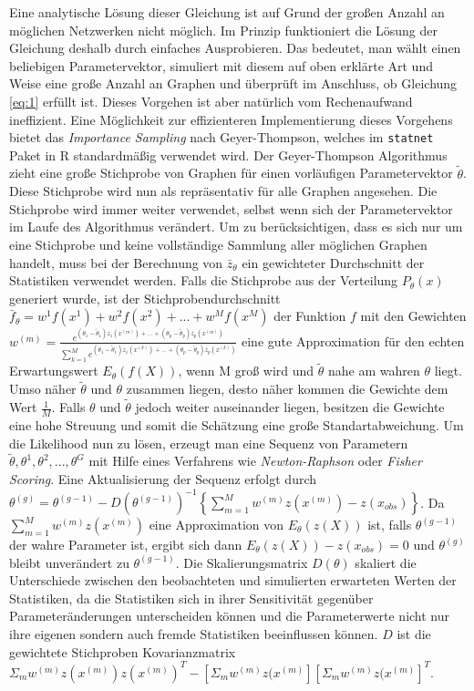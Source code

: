 \documentclass[a4paper,ngerman,oneside,titlepage,bibliography=totoc,11pt]{scrreprt}
\begin{document}
Eine analytische Lösung dieser Gleichung ist auf Grund der großen Anzahl an möglichen Netzwerken nicht möglich. Im Prinzip funktioniert die Lösung der Gleichung deshalb durch einfaches Ausprobieren. Das bedeutet, man wählt einen beliebigen Parametervektor, simuliert mit diesem auf oben erklärte Art und Weise eine große Anzahl an Graphen und überprüft im Anschluss, ob Gleichung \ref{eq:1} erfüllt ist. Dieses Vorgehen ist aber natürlich vom Rechenaufwand ineffizient. Eine Möglichkeit zur effizienteren Implementierung dieses Vorgehens bietet das \emph{Importance Sampling} nach Geyer-Thompson, welches im \texttt{statnet} Paket \citep{pack:statnet} in R  \citep{R} standardmäßig verwendet wird. Der Geyer-Thompson Algorithmus zieht eine große Stichprobe von Graphen für einen vorläufigen Parametervektor $\widetilde{\theta}$. Diese Stichprobe wird nun als repräsentativ für alle Graphen angesehen. Die Stichprobe wird immer weiter verwendet, selbst wenn sich der Parametervektor im Laufe des Algorithmus verändert. Um zu berücksichtigen, dass es sich nur um eine Stichprobe und keine vollständige Sammlung aller möglichen Graphen handelt, muss bei der Berechnung von $\bar{z}_\theta$ ein gewichteter Durchschnitt der Statistiken verwendet werden. Falls die Stichprobe aus der Verteilung $P_\theta(x)$ generiert wurde, ist der Stichprobendurchschnitt $\bar{f}_\theta = w^1 f(x^1) + w^2 f(x^2) + ... + w^M f(x^M)$ der Funktion $f$ mit den Gewichten $w^{(m)} = \frac{e^{(\theta_1-\widetilde{\theta}_1)z_1(x^{(m)})+...+(\theta_p-\widetilde{\theta}_p)z_p(x^{(m)})}}{\sum_{k=1}^{M}{e^{(\theta_1-\widetilde{\theta}_1)z_1(x^{(k)})+...+(\theta_p-\widetilde{\theta}_p)z_p(x^{(k)})}}}$ 
eine gute Approximation für den echten Erwartungswert $E_\theta(f(X))$, wenn M groß wird und $\widetilde{\theta}$ nahe am wahren $\theta$ liegt. Umso näher $\widetilde{\theta}$ und $\theta$ zusammen liegen, desto näher kommen die Gewichte dem Wert $\frac{1}{M}$. Falls $\theta$ und $\widetilde{\theta}$ jedoch weiter auseinander liegen, besitzen die Gewichte eine hohe Streuung und somit die Schätzung eine große Standartabweichung.
Um die Likelihood nun zu lösen, erzeugt man eine Sequenz von Parametern $\widetilde{\theta},\theta^{1}, \theta^{2},...,\theta^{G}$ mit Hilfe eines Verfahrens wie \emph{Newton-Raphson} oder \emph{Fisher Scoring}. Eine Aktualisierung der Sequenz erfolgt durch $\theta^{(g)} = \theta^{(g-1)} - {D(\theta^{(g-1)})}^{-1}\left\{\sum^{M}_{m = 1}{w^{(m)}z(x^{(m)})} - z(x_{obs})\right\}$. Da $\sum^{M}_{m = 1}{w^{(m)}z(x^{(m)})}$ eine Approximation von $E_\theta(z(X))$ ist, falls $\theta^{(g-1)}$ der wahre Parameter ist, ergibt sich dann $E_\theta(z(X)) - z(x_{obs}) = 0$ und $\theta^{(g)}$ bleibt unverändert zu $\theta^{(g-1)}$. Die Skalierungsmatrix $D(\theta)$ skaliert die Unterschiede zwischen den beobachteten und simulierten erwarteten Werten der Statistiken, da die Statistiken sich in ihrer Sensitivität gegenüber Parameteränderungen unterscheiden können und die Parameterwerte nicht nur ihre eigenen sondern auch fremde Statistiken beeinflussen können. $D$ ist die gewichtete Stichproben Kovarianzmatrix $\Sigma_m w^{(m)} z(x^{(m)}) z(x^{(m)})^T - \left[\Sigma_m w^{(m)} z(x^{(m)}\right] \left[\Sigma_m w^{(m)} z(x^{(m)}\right]^T$.
\end{document}
